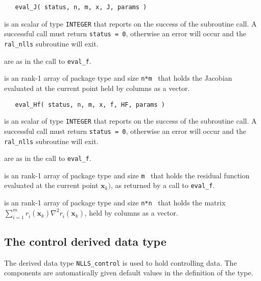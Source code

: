 \documentclass{spec}
\newcommand{\scalarintegerio}{is an \intentout scalar of type {\tt INTEGER} }
\newcommand{\ronearrayrealii}[1]{is an \intentin rank-1 array of package type and size {\tt #1}\ }
\newcommand{\ronearrayrealio}[1]{is an \intentout rank-1 array of package type and size {\tt #1}\ }
\newcommand{\vx}{ {\bm x} } %
\newcommand{\iter}[2][k]{ #2_{#1}^{}} %
\newcommand{\comp}[2][i]{ #2_{#1}^{}} %
\begin{document}
\begin{verbatim}
   eval_J( status, n, m, x, J, params )
\end{verbatim}

\begin{description}
   \scalarintegerio that reports on the success of the subroutine call.  
  A successful call must return {\tt status = 0}, otherwise an error will occur 
  and the {\tt ral\_nlls} subroutine will exit.

   are as in the call to {\tt eval\_f}.

  
   \ronearrayrealio{n*m} that holds the Jacobian evaluated at the current point held by columns as a vector.
  
\end{description}

\begin{verbatim}
   eval_Hf( status, n, m, x, f, HF, params )
\end{verbatim}

\begin{description}
   \scalarintegerio that reports on the success of the subroutine call.  
  A successful call must return {\tt status = 0}, otherwise an error will occur and the {\tt ral\_nlls} subroutine 
  will exit.

   are as in the call to {\tt eval\_f}.

  
   \ronearrayrealii{m} that holds the residual function
  evaluated at the current point $\vx_k)$, 
  as returned by a call to {\tt eval\_f}.

   \ronearrayrealio{n*n} that holds the matrix $\sum_{i = 1}^m \comp{r}(\iter{\vx})\nabla^2\comp{r}(\iter{\vx})$, held by columns as a vector.
  
\end{description}



\subsection{The control derived data type}
\label{typecontrol} 

The derived data type {\tt NLLS\_control} 
is used to hold controlling data. The components  are automatically 
given default values in the definition of the type.

\vspace{2mm}
\end{document}
